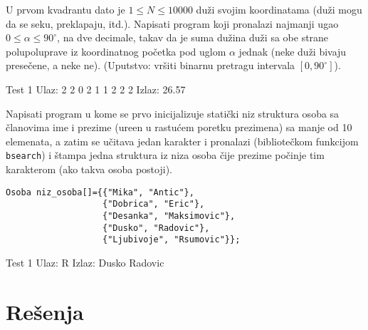 \begin{Exercise}[label=406]
  U prvom kvadrantu dato je $1 \leq N \leq 10000$ du\v zi svojim
  koordinatama (du\v zi mogu da se seku, preklapaju, itd.). Napisati
  program koji pronalazi najmanji ugao $0 \leq \alpha \leq 90^\circ$,
  na dve decimale, takav da je suma du\v zina du\v zi sa obe strane
  polupoluprave iz koordinatnog po\v cetka pod uglom $\alpha$ jednak
  (neke du\v zi bivaju prese\v cene, a neke ne). (Uputstvo: vr\v siti
  binarnu pretragu intervala $[0, 90^\circ]$).
  
  \begin{miditest}
    \begin{test}{Test 1}
     Ulaz:
     2
     2 0 2 1
     1 2 2 2
     Izlaz:
     26.57 
    \end{test}
  \end{miditest}
  
\end{Exercise}

\begin{Exercise}[label=407]
  Napisati program u kome se prvo inicijalizuje stati\v{c}ki niz
  struktura osoba sa \v{c}lanovima ime i prezime (ure\dj en u
  rastu\'cem poretku prezimena) sa manje od 10 elemenata, a zatim se
  u\v{c}itava jedan karakter i pronalazi (bibliote\v{c}kom funkcijom
  \verb|bsearch|) i \v{s}tampa jedna struktura iz niza osoba \v{c}ije
  prezime po\v{c}inje tim karakterom (ako takva osoba postoji).
\begin{verbatim}
Osoba niz_osoba[]={{"Mika", "Antic"},
                   {"Dobrica", "Eric"},
                   {"Desanka", "Maksimovic"},
                   {"Dusko", "Radovic"},
                   {"Ljubivoje", "Rsumovic"}};
\end{verbatim}
  
  \begin{miditest}
    \begin{test}{Test 1}
      Ulaz:  R
      Izlaz: Dusko Radovic
    \end{test}
  \end{miditest}
  
\end{Exercise}


\section{Rešenja}

\shipoutAnswer


